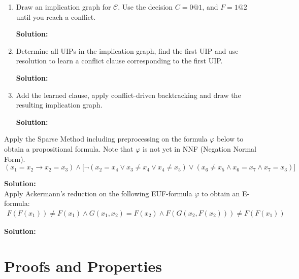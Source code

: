 \documentclass[11pt,a4paper]{uebung}
\newcommand{\solution}[1]{\par {\bf Solution:}\\#1}
\begin{document}
\begin{enumerate}
\item Draw an implication graph for $\mathcal{C}$. Use the decision $C=0@1$,
  and $F=1@2$ until you reach a conflict.


\solution{

}

\item Determine all UIPs in the implication graph, find the first UIP and use
  resolution to learn a conflict clause corresponding to the first UIP.

\solution{

}

\item Add the learned clause, apply conflict-driven backtracking and draw the
  resulting implication graph.

\solution{

}
\end{enumerate}


Apply the Sparse Method including preprocessing on the formula $\varphi$
below to obtain a propositional formula. Note that $\varphi$ is not yet in NNF
(Negation Normal Form).
\begin{displaymath}
  (x_1 = x_2 \rightarrow x_2=x_3) \land
  \big[ \neg (x_2 = x_4 \lor x_3 \neq x_4
  \lor x_4 \neq x_5)
  \lor (x_6 \neq x_5 \land x_6=x_7 \land x_7=x_3)\big]
\end{displaymath}

\solution{

}


Apply Ackermann's reduction on the following EUF-formula $\varphi$ to obtain
an E-formula:
\begin{gather*}
  F(F(x_1)) \neq F(x_1) \land G(x_1,x_2) = F(x_2) \land F(G(x_2,F(x_2))) \neq F(F(x_1))
\end{gather*}

\solution{

}



\newpage
\section{Proofs and Properties}
\end{document}
